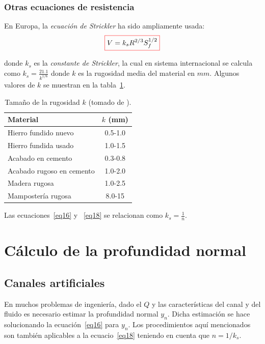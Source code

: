 \documentclass[11pt, oneside]{article}
\begin{document}
\subsubsection{Otras ecuaciones de resistencia}
En Europa, la \emph{ecuaci\'on de Strickler} ha sido ampliamente usada:
\begin{equation}
\color{red}\boxed{\color{black} V = k_s R^{2/3} S_f^{1/2}}
\label{eq18}
\end{equation}

donde $k_s$ es la \emph{constante de Strickler}, la cual en sistema internacional se calcula como $k_s = \frac{21.1}{k^{1/6}}$ donde $k$ es la rugosidad media del material en $mm$. Algunos valores de $k$ se muestran en la tabla~\ref{ta2}.

\begin{table}[h!]
\centering
\begin{tabular}{l c}
 \hline
  Material & $k$ (mm) \\ [0.5ex]
 \hline\hline
 Hierro fundido nuevo & 0.5-1.0 \\
 Hierro fundida usado & 1.0-1.5 \\
 Acabado en cemento & 0.3-0.8 \\
 Acabado rugoso en cemento & 1.0-2.0 \\
 Madera rugosa & 1.0-2.5 \\
 Mamposter\'ia rugosa & 8.0-15 \\
\hline
\end{tabular}
\caption{Tamaño de la rugosidad $k$ (tomado de \cite{VChow}).}
\label{ta2}
\end{table}

Las ecuaciones~\ref{eq16} y ~\ref{eq18} se relacionan como $k_s = \frac{1}{n}$. 

\section{C\'alculo de la profundidad normal} \label{ynorm} %
\subsection{Canales artificiales}
En muchos problemas de ingenier\'ia, dado el $Q$ y las caracter\'isticas del canal y del fluido es necesario estimar la profundidad normal $y_n$. Dicha estimaci\'on se hace solucionando la ecuaci\'on~\ref{eq16} para $y_n$. Los procedimientos aqu\'i mencionados son tambi\'en aplicables a la ecuacio~\ref{eq18} teniendo en cuenta que $n=1/ k_s$.
\end{document}
